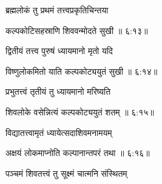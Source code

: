 {\devanagarifont ब्रह्मलोकं तु प्रथमं तत्त्वप्रकृतिचिन्तया \thinspace{\danda} \dontdisplaylinenum }%


{\devanagarifont कल्पकोटिसहस्राणि शिववन्मोदते सुखी {॥ ६:१३॥} \veg\dontdisplaylinenum }%

{\devanagarifont द्वितीयं तत्त्व पुरुषं ध्यायमानो मृतो यदि \thinspace{\dandab} \dontdisplaylinenum }%
 

{\devanagarifont विष्णुलोकमितो याति कल्पकोट्ययुतं सुखी {॥ ६:१४॥} \veg\dontdisplaylinenum }%

{\devanagarifont प्रभुतत्त्वं तृतीयं तु ध्यायमानो मरिष्यति \thinspace{\dandab} \dontdisplaylinenum }%


{\devanagarifont शिवलोके वसेन्नित्यं कल्पकोट्ययुतं शतम् {॥ ६:१५॥} \veg\dontdisplaylinenum }%

{\devanagarifont विद्यातत्त्वामृतं ध्यायेत्सदाशिवमनामयम् \thinspace{\dandab} \dontdisplaylinenum }%


{\devanagarifont अक्षयं लोकमाप्नोति कल्पानान्तपरं तथा {॥ ६:१६॥} \veg\dontdisplaylinenum  }%

{\devanagarifont पञ्चमं शिवतत्त्वं तु सूक्ष्मं चात्मनि संस्थितम् \thinspace{\dandab} \dontdisplaylinenum }%
 
